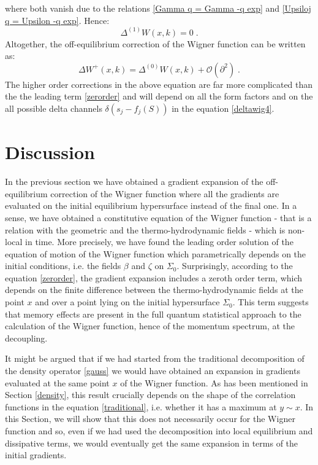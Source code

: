 \documentclass[prd,superscriptaddress,nofootinbib,notitlepage]{revtex4-1}
\begin{document}
%
where both vanish due to the relations \eqref{Gamma q = Gamma -q exp} and \eqref{Upsiloj q = Upsilon -q exp}. Hence:
%
\begin{equation*}
    \Delta^{(1)}W\left(x,k\right)=0\;.
\end{equation*}
%
Altogether, the off-equilibrium correction of the Wigner function can be written as:
%
\begin{equation}
    \Delta W^+\left(x,k\right)=\Delta^{(0)}W\left(x,k\right)+\mathcal{O}(\partial^2)\;.
\end{equation}
%
The higher order corrections in the above equation are far more complicated than the the leading term 
\eqref{zerorder} and will depend on all the form factors and on the all possible delta channels $\delta(s_j -f_j(S))$
in the equation \eqref{deltawig4}.


\section{Discussion}
\label{discussion}

In the previous section we have obtained a gradient expansion of the off-equilibrium correction of the Wigner 
function where all the gradients are evaluated on the initial equilibrium hypersurface instead of the final one. 
In a sense, we have obtained a constitutive equation of the Wigner function - that is a relation with the geometric and 
the thermo-hydrodynamic fields - which is non-local in time. More precisely, we have found the leading order solution of 
the equation of motion of the Wigner 
function which parametrically depends on the initial conditions, i.e. the fields $\beta$ and $\zeta$ on $\Sigma_0$.
Surprisingly, according to the equation \eqref{zerorder}, the gradient expansion includes a zeroth order term, which depends on 
the finite difference between the thermo-hydrodynamic fields at the point $x$ and over a point lying on the initial hypersurface 
$\Sigma_0$. This term suggests that memory effects are present in the full quantum statistical approach to the calculation of the 
Wigner function, hence of the momentum spectrum, at the decoupling.

It might be argued that if we had started from the traditional decomposition of the density operator \eqref{gauss} we would have
obtained an expansion in gradients evaluated at the same point $x$ of the Wigner function. As has been mentioned in Section
\ref{density}, this result crucially depends on the shape of the correlation functions in the equation \eqref{traditional}, i.e. whether 
it has a maximum at $y \sim x$. In this Section, we will show that this does not necessarily occur for the Wigner function and so, 
even if we had used the decomposition into local equilibrium and dissipative terms, we would eventually get the same expansion in terms of
the initial gradients. 
\end{document}
